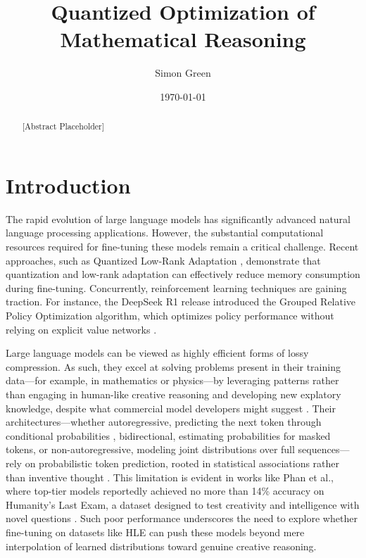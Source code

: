 \documentclass{svproc}
\title{Quantized Optimization of Mathematical Reasoning}
\author{Simon Green\inst{1}}
\institute{
    School of Computing, University of Leeds, UK \\
    \inst{1} MSc, Artificial Intelligence \\
    \email{\{od21sg\}@leeds.ac.uk}
}
\date{\today}
\begin{document}
\maketitle


\begin{abstract}
  [Abstract Placeholder]
\end{abstract}


\section{Introduction}

The rapid evolution of large language models has significantly advanced natural language processing applications. However, the substantial computational resources required for fine-tuning these models remain a critical challenge. Recent approaches, such as Quantized Low-Rank Adaptation \cite{dettmers2023qloraefficientfinetuningquantized}, demonstrate that quantization and low-rank adaptation can effectively reduce memory consumption during fine-tuning. Concurrently, reinforcement learning techniques are gaining traction. For instance, the DeepSeek R1 release introduced the Grouped Relative Policy Optimization algorithm, which optimizes policy performance without relying on explicit value networks \cite{shao2024deepseekmathpushinglimitsmathematical, schulman2017proximalpolicyoptimizationalgorithms}.

Large language models can be viewed as highly efficient forms of lossy compression. As such, they excel at solving problems present in their training data—for example, in mathematics or physics—by leveraging patterns rather than engaging in human-like creative reasoning and developing new explatory knowledge, despite what commercial model developers might suggest \cite{deutsch2011beginning}. Their architectures—whether autoregressive, predicting the next token through conditional probabilities \cite{vaswani2023attentionneed}, bidirectional, estimating probabilities for masked tokens, or non-autoregressive, modeling joint distributions over full sequences—rely on probabilistic token prediction, rooted in statistical associations rather than inventive thought \cite{gu2018nonautoregressiveneuralmachinetranslation, lee2018deterministicnonautoregressiveneuralsequence}. This limitation is evident in works like Phan et al., where top-tier models reportedly achieved no more than 14\% accuracy on Humanity’s Last Exam, a dataset designed to test creativity and intelligence with novel questions \cite{phan2025humanitysexam}. Such poor performance underscores the need to explore whether fine-tuning on datasets like HLE can push these models beyond mere interpolation of learned distributions toward genuine creative reasoning.
\end{document}
